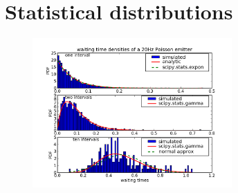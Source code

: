 \section{Statistical distributions}
\label{sec:stats_distributions}






\begin{figure}
\begin{centering}\includegraphics[width=3in]{fig/stats_distributions}\par\end{centering}

\caption{\label{fig:stats_distributions}}
\end{figure}
